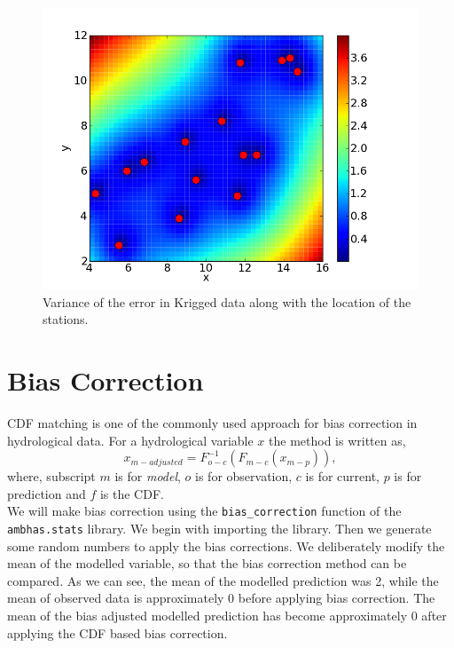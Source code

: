 \documentclass[10pt]{book}
\begin{document}
\beforefig
\begin{figure}[h!]
  \centering
    \includegraphics[scale=0.5]{images/krige_12.png}
  \caption{Variance of the error in Krigged data along with the location of the stations.}
   \label{fig:krige_12}
\end{figure}
\afterfig

\section{Bias Correction}
CDF matching is one of the commonly used approach for bias correction in hydrological data. For a hydrological variable $x$ the method is written as,
\begin{equation}
x_{m-adjusted} = F^{-1}_{o-c}\left(F_{m-c} \left(x_{m-p} \right) \right),
\end{equation}
where, subscript $m$ is for \emph{model}, $o$ is for observation, $c$ is for current, $p$ is for prediction and $f$ is the CDF. \\

We will make bias correction using the \verb"bias_correction" function of the \verb"ambhas.stats" library. We begin with importing the library. Then we generate some random numbers to apply the bias corrections. We deliberately modify the mean of the modelled variable, so that the bias correction method can be compared. As we can see, the mean of the modelled prediction was 2, while the mean of observed data is approximately 0 before applying bias correction. The mean of the bias adjusted modelled prediction has become approximately 0 after applying the CDF based bias correction. \\
\end{document}
